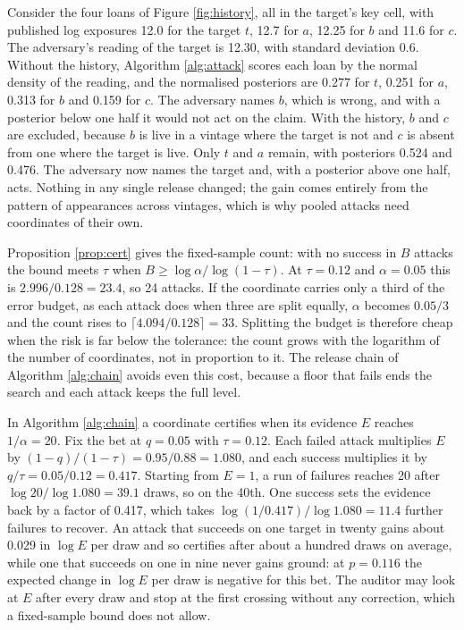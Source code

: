 \begin{example}\label{ex:history}
Consider the four loans of Figure \ref{fig:history}, all in the target's key cell,
with published log exposures 12.0 for the target $t$, 12.7 for $a$, 12.25 for
$b$ and 11.6 for $c$. The adversary's reading of the target is 12.30, with
standard deviation 0.6. Without the history, Algorithm \ref{alg:attack} scores
each loan by the normal density of the reading, and the normalised posteriors are
0.277 for $t$, 0.251 for $a$, 0.313 for $b$ and 0.159 for $c$. The adversary names
$b$, which is wrong, and with a posterior below one half it would not act on the
claim. With the history, $b$ and $c$ are excluded, because $b$ is live in a
vintage where the target is not and $c$ is absent from one where the target is
live. Only $t$ and $a$ remain, with posteriors 0.524 and 0.476. The adversary now
names the target and, with a posterior above one half, acts. Nothing in any
single release changed; the gain comes entirely from the pattern of appearances
across vintages, which is why pooled attacks need coordinates of their own.
\end{example}

\begin{example}\label{ex:zero}
Proposition \ref{prop:cert} gives the fixed-sample count: with no success in $B$
attacks the bound meets $\tau$ when $B \ge \log\alpha/\log(1-\tau)$. At
$\tau = 0.12$ and $\alpha = 0.05$ this is $2.996/0.128 = 23.4$, so 24 attacks. If
the coordinate carries only a third of the error budget, as each attack does when
three are split equally, $\alpha$ becomes $0.05/3$ and the count rises to
$\lceil 4.094/0.128\rceil = 33$. Splitting the budget is therefore cheap when the
risk is far below the tolerance: the count grows with the logarithm of the number
of coordinates, not in proportion to it. The release chain of Algorithm
\ref{alg:chain} avoids even this cost, because a floor that fails ends the search
and each attack keeps the full level.
\end{example}

\begin{example}\label{ex:gate}
In Algorithm \ref{alg:chain} a coordinate certifies when its evidence $E$ reaches
$1/\alpha = 20$. Fix the bet at $q = 0.05$ with $\tau = 0.12$. Each failed attack
multiplies $E$ by $(1-q)/(1-\tau) = 0.95/0.88 = 1.080$, and each success
multiplies it by $q/\tau = 0.05/0.12 = 0.417$. Starting from $E = 1$, a run of
failures reaches 20 after $\log 20/\log 1.080 = 39.1$ draws, so on the 40th. One
success sets the evidence back by a factor of 0.417, which takes
$\log(1/0.417)/\log 1.080 = 11.4$ further failures to recover. An attack that
succeeds on one target in twenty gains about 0.029 in $\log E$ per draw and so
certifies after about a hundred draws on average, while one that succeeds on one
in nine never gains ground: at
$p = 0.116$ the expected change in $\log E$ per draw is negative for this bet.
The auditor may look at $E$ after every draw and stop at the first crossing
without any correction, which a fixed-sample bound does not allow.
\end{example}


